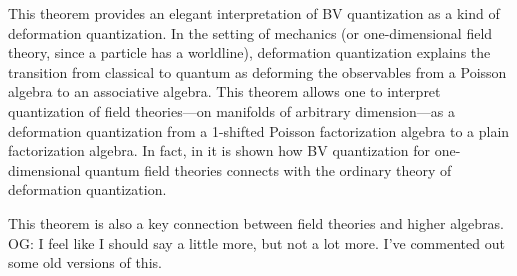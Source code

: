 \documentclass[11pt]{amsart}
\def\owen#1{{\textcolor{violet!50!black}{OG: {#1}}}}
\begin{document}
This theorem provides an elegant interpretation of BV quantization as a kind of deformation quantization. 
In the setting of mechanics (or one-dimensional field theory, since a particle has a worldline), deformation quantization explains the transition from classical to quantum as deforming the observables from a Poisson algebra to an associative algebra. 
This theorem allows one to interpret quantization of field theories---on manifolds of arbitrary dimension---as a deformation quantization from a 1-shifted Poisson factorization algebra to a plain factorization algebra. 
In fact, in \cite{GLL,Si Kai and Zhengping} it is shown how BV quantization for one-dimensional quantum field theories connects with the ordinary theory of deformation quantization. 

This theorem is also a key connection between field theories and higher algebras.
\owen{I feel like I should say a little more, but not a lot more. I've commented out some old versions of this.}
\end{document}
